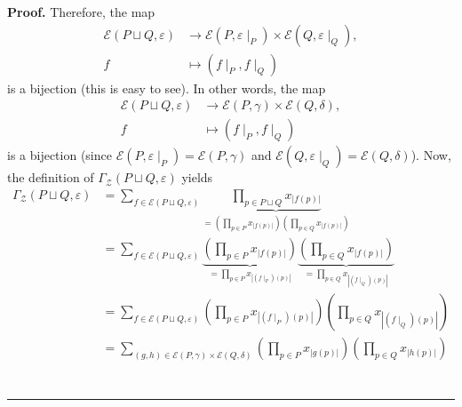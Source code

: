 \documentclass[numbers=enddot,12pt,final,onecolumn,notitlepage]{scrartcl}%
\theoremstyle{definition}
\newenvironment{proof}[1][Proof]{\noindent\textbf{#1.} }{\ \rule{0.5em}{0.5em}}
\let\sumnonlimits\sum
\let\prodnonlimits\prod
\renewcommand{\sum}{\sumnonlimits\limits}
\renewcommand{\prod}{\prodnonlimits\limits}
\begin{document}
\begin{proof}
Therefore, the map
\begin{align*}
\mathcal{E}\left(  P\sqcup Q,\varepsilon\right)   &  \rightarrow
\mathcal{E}\left(  P,\varepsilon\mid_P\right)
\times\mathcal{E}\left(  Q,\varepsilon\mid_Q\right)
, \\
f  &  \mapsto\left(  f\mid_{P},f\mid_{Q}\right)
\end{align*}
is a bijection (this is easy to see). In other words, the map
\begin{align}
\mathcal{E}\left(  P\sqcup Q,\varepsilon\right)   &  \rightarrow
\mathcal{E}\left(  P,\gamma\right)  \times\mathcal{E}\left(  Q,\delta\right)
,\nonumber\\
f  &  \mapsto\left(  f\mid_{P},f\mid_{Q}\right)  \label{pf.prop.prod1.bij}%
\end{align}
is a bijection (since $\mathcal{E}\left(P, \varepsilon\mid_P\right)
= \mathcal{E}\left(P, \gamma\right)$
and
$\mathcal{E}\left(Q, \varepsilon\mid_Q\right)
= \mathcal{E}\left(Q, \delta\right)$).
Now, the definition of
$\Gamma_{\mathcal{Z}}\left(  P\sqcup Q,\varepsilon\right)$
yields
\begin{align*}
\Gamma_{\mathcal{Z}}\left(  P\sqcup Q,\varepsilon\right)   &  =\sum
_{f\in\mathcal{E}\left(  P\sqcup Q,\varepsilon\right)  }\underbrace{\prod
_{p\in P\sqcup Q}x_{\left\vert f\left(  p\right)  \right\vert }}_{=\left(
\prod_{p\in P}x_{\left\vert f\left(  p\right)  \right\vert }\right)  \left(
\prod_{p\in Q}x_{\left\vert f\left(  p\right)  \right\vert }\right)  }\\
&  = \sum_{f\in\mathcal{E}\left(  P\sqcup Q,\varepsilon\right)  }
\underbrace{
 \left( \prod_{p\in P}x_{\left\vert f\left(  p\right)  \right\vert }\right)
}_{
 =
 \prod_{p\in P}x_{\left\vert \left(f\mid_P\right) \left(  p\right)  \right\vert }
}
\underbrace{
 \left( \prod_{p\in Q}x_{\left\vert f\left(  p\right)  \right\vert }\right)
}_{
 =
 \prod_{p\in Q}x_{\left\vert \left(f\mid_Q\right) \left(  p\right)  \right\vert }
}
\\
&  = \sum_{f\in\mathcal{E}\left(  P\sqcup Q,\varepsilon\right)  }
 \left( \prod_{p\in P}x_{\left\vert \left(f\mid_P\right) \left(  p\right)  \right\vert }
 \right)
 \left(
 \prod_{p\in Q}x_{\left\vert \left(f\mid_Q\right) \left(  p\right)  \right\vert }
 \right)
\\
&  =
\sum_{\left(g, h\right) \in \mathcal{E}\left(  P,\gamma\right) 
            \times \mathcal{E}\left(  Q,\delta\right) }
\left( \prod_{p\in P}x_{\left\vert g\left(  p\right)  \right\vert }\right)
\left(\prod_{p\in Q}x_{\left\vert
h\left(  p\right)  \right\vert }\right) \\

\end{align*}
\end{proof}
\end{document}
